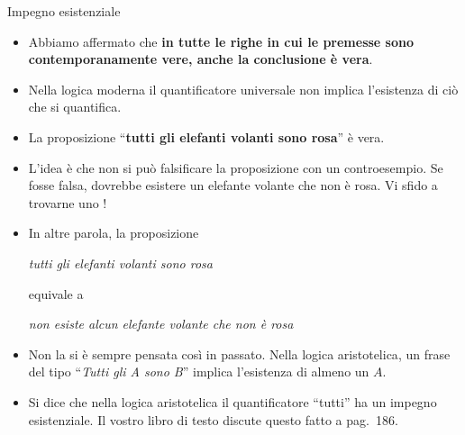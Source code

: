 \documentclass[aspectratio=169,10pt,dvipsnames,xcolor=table,handout]{beamer}
\begin{document}
\begin{frame}{Impegno esistenziale}

    \begin{itemize}[<+->]
        \item Abbiamo affermato che \textbf{in tutte le righe in cui le premesse sono contemporanamente vere, anche la conclusione è vera}.
        \item Nella logica moderna il quantificatore universale non implica l'esistenza di ciò che si quantifica.
        \item La proposizione ``\textbf{tutti gli elefanti volanti sono rosa}'' è vera.
        \item L'idea è che non si può falsificare la proposizione con un controesempio. Se fosse falsa, dovrebbe esistere un elefante volante che non è rosa. Vi sfido a trovarne uno !
        \item  In altre parola, la proposizione
        \begin{center}
            \emph{tutti gli elefanti volanti sono rosa}
        \end{center}
        equivale a \begin{center}
            \emph{non esiste alcun elefante volante che non è rosa}
        \end{center}
        \item Non la si è sempre pensata così in passato. Nella \alert{logica aristotelica}, un frase del tipo ``\emph{Tutti gli A sono B}'' implica l'esistenza di almeno un $A$.
        \item Si dice che nella logica aristotelica il quantificatore ``tutti'' ha un \alert{impegno esistenziale}. Il vostro libro di testo discute questo fatto a pag.~186.
    \end{itemize}
\end{frame}
\end{document}
